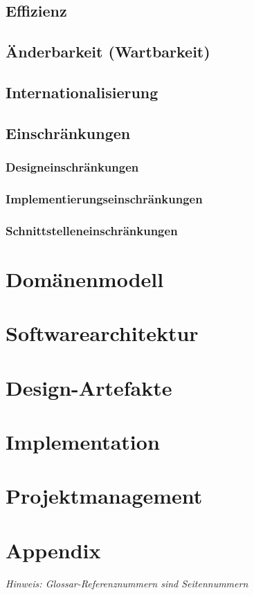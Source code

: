 \documentclass[11pt,ngerman]{article}
\begin{document}
    \subsection{Effizienz}

    \subsection{Änderbarkeit (Wartbarkeit)}

    \subsection{Internationalisierung}

    \subsection{Einschränkungen}

    \subsubsection{Designeinschränkungen}

    \subsubsection{Implementierungseinschränkungen}

    \subsubsection{Schnittstelleneinschränkungen}

    \section{Domänenmodell}

    \section{Softwarearchitektur}

    \section{Design-Artefakte}

    \section{Implementation}

    \section{Projektmanagement}


     \newpage

    \section{Appendix}
    \textit{Hinweis: Glossar-Referenznummern sind Seitennummern}
    \printglossary
\end{document}
